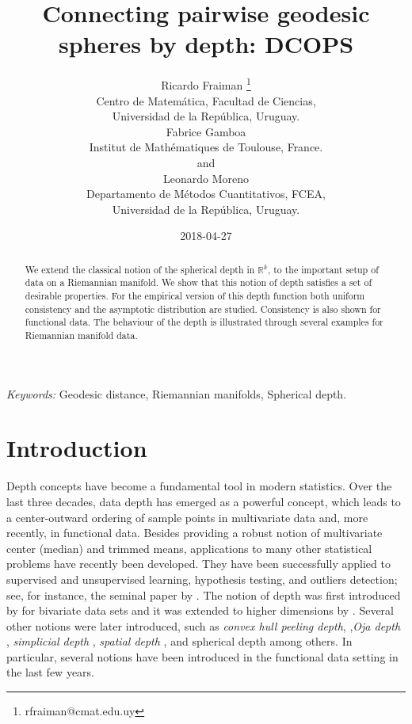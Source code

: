 \documentclass[a4paper]{article}
\title{\bf Connecting pairwise geodesic spheres by depth: DCOPS}
\author{Ricardo Fraiman \thanks{rfraiman@cmat.edu.uy}\hspace{.2cm}\\
    Centro de Matem\'atica, Facultad de Ciencias, \\
     Universidad de la Rep\'ublica, Uruguay.\\
   Fabrice Gamboa \\
    Institut de Math\'ematiques de Toulouse, France.\\
 and \\ 
Leonardo Moreno \\ 
Departamento de M\'etodos Cuantitativos, FCEA, \\
Universidad de la Rep\'ublica, Uruguay.}
\date{2018-04-27}
\numberwithin{equation}{section}
\begin{document}
\maketitle

\begin{abstract}
We extend the classical notion of the spherical depth in $\mathbb{R}^k$, to the important setup of data on a  Riemannian manifold. We show that this notion of depth satisfies a set of desirable properties. For the empirical version of this depth function both uniform consistency and the asymptotic distribution are studied. Consistency is also shown for functional data. The behaviour of the depth is illustrated through several examples for Riemannian manifold data.
\end{abstract}

\noindent%
{\it Keywords:}  Geodesic distance, Riemannian manifolds, Spherical depth.






\section{Introduction}	%

Depth concepts have become a fundamental tool in modern statistics.  Over the last three decades, data depth has emerged as a powerful concept, which leads to a center-outward ordering of sample points in multivariate data and, more recently, in functional data. Besides providing a robust notion of multivariate center (median) and trimmed means, applications to many other statistical problems have recently been developed. They have been successfully applied to supervised and unsupervised learning, hypothesis testing, and outliers detection; see, for instance, the seminal paper by \cite{liu1999}. The notion of depth was first introduced by \cite{tukey1975} for bivariate data sets and it was extended to higher dimensions by \cite{donoho1992}.  Several other notions were later introduced, such as \textit{convex hull peeling depth}, \cite{barnett1976},\textit{Oja depth} \cite{oja1983},  \textit{simplicial depth} \cite{liu1990}, \textit{spatial depth} \cite{vardi2000}, and spherical depth \cite{elmore2006} among others. In particular, several notions have been introduced in the functional data setting in the last few years.
\end{document}
